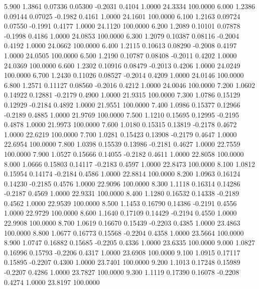    5.900   1.3861   0.07336   0.05300  -0.2031   0.4104   1.0000  24.3334 100.0000
   6.000   1.2386   0.09144   0.07025  -0.1982   0.4161   1.0000  24.1601 100.0000
   6.100   1.2163   0.09724   0.07550  -0.1991   0.4177   1.0000  24.1120 100.0000
   6.200   1.2089   0.10101   0.07878  -0.1998   0.4186   1.0000  24.0853 100.0000
   6.300   1.2079   0.10387   0.08116  -0.2004   0.4192   1.0000  24.0662 100.0000
   6.400   1.2115   0.10613   0.08290  -0.2008   0.4197   1.0000  24.0505 100.0000
   6.500   1.2190   0.10787   0.08408  -0.2011   0.4202   1.0000  24.0369 100.0000
   6.600   1.2302   0.10916   0.08479  -0.2013   0.4206   1.0000  24.0249 100.0000
   6.700   1.2430   0.11026   0.08527  -0.2014   0.4209   1.0000  24.0146 100.0000
   6.800   1.2571   0.11127   0.08560  -0.2016   0.4212   1.0000  24.0046 100.0000
   7.200   1.0602   0.14922   0.12881  -0.2179   0.4900   1.0000  21.9315 100.0000
   7.300   1.0786   0.15129   0.12929  -0.2184   0.4892   1.0000  21.9551 100.0000
   7.400   1.0986   0.15377   0.12966  -0.2189   0.4885   1.0000  21.9769 100.0000
   7.500   1.1210   0.15695   0.12995  -0.2195   0.4878   1.0000  21.9973 100.0000
   7.600   1.0180   0.15315   0.13819  -0.2178   0.4672   1.0000  22.6219 100.0000
   7.700   1.0281   0.15423   0.13908  -0.2179   0.4647   1.0000  22.6954 100.0000
   7.800   1.0398   0.15539   0.13986  -0.2181   0.4627   1.0000  22.7559 100.0000
   7.900   1.0527   0.15666   0.14055  -0.2182   0.4611   1.0000  22.8058 100.0000
   8.000   1.0666   0.15803   0.14117  -0.2183   0.4597   1.0000  22.8473 100.0000
   8.100   1.0812   0.15954   0.14174  -0.2184   0.4586   1.0000  22.8814 100.0000
   8.200   1.0963   0.16124   0.14230  -0.2185   0.4576   1.0000  22.9096 100.0000
   8.300   1.1118   0.16314   0.14286  -0.2187   0.4569   1.0000  22.9331 100.0000
   8.400   1.1280   0.16532   0.14338  -0.2189   0.4562   1.0000  22.9539 100.0000
   8.500   1.1453   0.16790   0.14386  -0.2191   0.4556   1.0000  22.9729 100.0000
   8.600   1.1640   0.17109   0.14429  -0.2194   0.4550   1.0000  22.9908 100.0000
   8.700   1.0619   0.16670   0.15439  -0.2203   0.4385   1.0000  23.4863 100.0000
   8.800   1.0677   0.16773   0.15568  -0.2204   0.4358   1.0000  23.5664 100.0000
   8.900   1.0747   0.16882   0.15685  -0.2205   0.4336   1.0000  23.6335 100.0000
   9.000   1.0827   0.16996   0.15793  -0.2206   0.4317   1.0000  23.6908 100.0000
   9.100   1.0915   0.17117   0.15895  -0.2207   0.4300   1.0000  23.7401 100.0000
   9.200   1.1013   0.17248   0.15989  -0.2207   0.4286   1.0000  23.7827 100.0000
   9.300   1.1119   0.17390   0.16078  -0.2208   0.4274   1.0000  23.8197 100.0000
